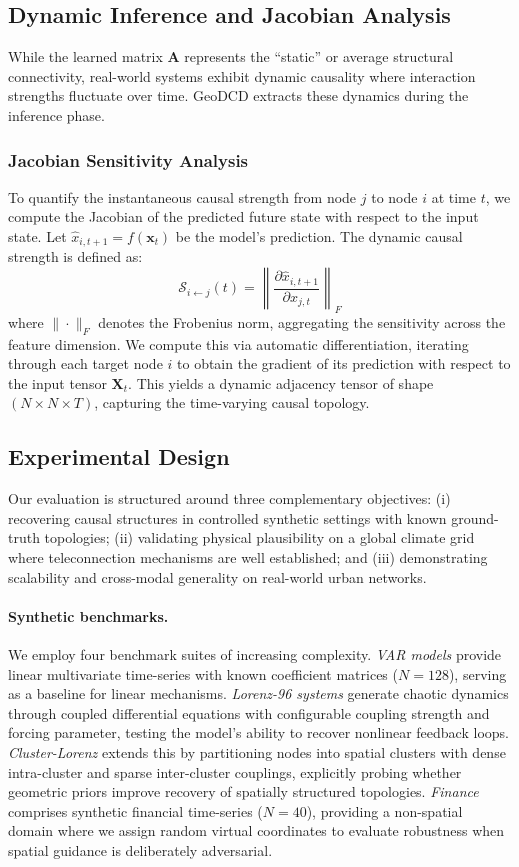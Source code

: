 \documentclass{article}
\begin{document}
\subsection{Dynamic Inference and Jacobian Analysis}
While the learned matrix $\mathbf{A}$ represents the ``static'' or average structural connectivity, real-world systems exhibit dynamic causality where interaction strengths fluctuate over time. GeoDCD extracts these dynamics during the inference phase.
\subsubsection{Jacobian Sensitivity Analysis}
To quantify the instantaneous causal strength from node $j$ to node $i$ at time $t$, we compute the Jacobian of the predicted future state with respect to the input state.
Let $\hat{x}_{i, t+1} = f(\mathbf{x}_t)$ be the model's prediction. The dynamic causal strength is defined as:
\begin{equation}
\mathcal{S}_{i \leftarrow j}(t) = \left\| \frac{\partial \hat{x}_{i, t+1}}{\partial x_{j, t}} \right\|_F
\end{equation}
where $\|\cdot\|_F$ denotes the Frobenius norm, aggregating the sensitivity across the feature dimension. We compute this via automatic differentiation, iterating through each target node $i$ to obtain the gradient of its prediction with respect to the input tensor $\mathbf{X}_t$. This yields a dynamic adjacency tensor of shape $(N \times N \times T)$, capturing the time-varying causal topology.

\subsection{Experimental Design}
Our evaluation is structured around three complementary objectives: (i) recovering causal structures in controlled synthetic settings with known ground-truth topologies; (ii) validating physical plausibility on a global climate grid where teleconnection mechanisms are well established; and (iii) demonstrating scalability and cross-modal generality on real-world urban networks.

\paragraph{Synthetic benchmarks.}
We employ four benchmark suites of increasing complexity. \textit{VAR models} provide linear multivariate time-series with known coefficient matrices ($N=128$), serving as a baseline for linear mechanisms. \textit{Lorenz-96 systems} generate chaotic dynamics through coupled differential equations with configurable coupling strength and forcing parameter, testing the model's ability to recover nonlinear feedback loops. \textit{Cluster-Lorenz} extends this by partitioning nodes into spatial clusters with dense intra-cluster and sparse inter-cluster couplings, explicitly probing whether geometric priors improve recovery of spatially structured topologies. \textit{Finance} comprises synthetic financial time-series ($N=40$), providing a non-spatial domain where we assign random virtual coordinates to evaluate robustness when spatial guidance is deliberately adversarial.
\end{document}
